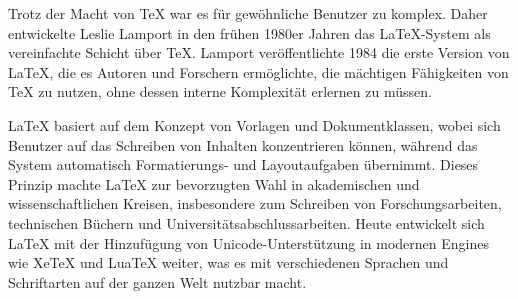 \documentclass[a4paper,12pt]{article}
\begin{document}
  Trotz der Macht von TeX war es für gewöhnliche Benutzer zu komplex. Daher entwickelte Leslie Lamport in den frühen 1980er Jahren das LaTeX-System als vereinfachte Schicht über TeX. Lamport veröffentlichte 1984 die erste Version von LaTeX, die es Autoren und Forschern ermöglichte, die mächtigen Fähigkeiten von TeX zu nutzen, ohne dessen interne Komplexität erlernen zu müssen.
  
  LaTeX basiert auf dem Konzept von Vorlagen und Dokumentklassen, wobei sich Benutzer auf das Schreiben von Inhalten konzentrieren können, während das System automatisch Formatierungs- und Layoutaufgaben übernimmt. Dieses Prinzip machte LaTeX zur bevorzugten Wahl in akademischen und wissenschaftlichen Kreisen, insbesondere zum Schreiben von Forschungsarbeiten, technischen Büchern und Universitätsabschlussarbeiten. Heute entwickelt sich LaTeX mit der Hinzufügung von Unicode-Unterstützung in modernen Engines wie XeTeX und LuaTeX weiter, was es mit verschiedenen Sprachen und Schriftarten auf der ganzen Welt nutzbar macht.
\end{document}
